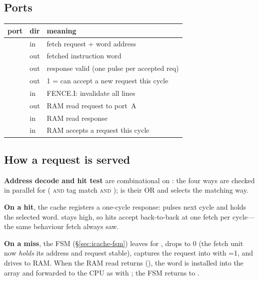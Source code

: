 \subsection{Ports}
\begin{center}\small
\begin{tabularx}{\textwidth}{>{\raggedright\arraybackslash}p{3.9cm} l Y}
\toprule
\textbf{port} & \textbf{dir} & \textbf{meaning}\\\midrule
{} & in  & fetch request + word address\\
             & out & fetched instruction word\\
            & out & response valid (one pulse per accepted req)\\
             & out & 1 = can accept a new request this cycle\\
                  & in  & FENCE.I: invalidate all lines\\
 & out & RAM read request to port~A\\
 & in & RAM read response\\
             & in  & RAM accepts a request this cycle\\
\bottomrule
\end{tabularx}
\end{center}

\subsection{How a request is served}
\textbf{Address decode and hit test} are combinational on : the
four ways are checked in parallel for ( \textsc{and} tag match
\textsc{and} );  is their OR and 
selects the matching way.

\textbf{On a hit}, the cache registers a one-cycle response: 
pulses next cycle and  holds the selected word. 
stays high, so hits accept back-to-back at one fetch per cycle---the same
behaviour fetch always saw.

\textbf{On a miss}, the FSM (\S\ref{sec:icache-fsm}) leaves  for
, drops  to 0 (the fetch unit now \emph{holds} its
address and request stable), captures the request into  with =1, and drives  to RAM. When the
RAM read returns (), the word is installed into the array and
forwarded to the CPU as  with ; the FSM returns
to .

